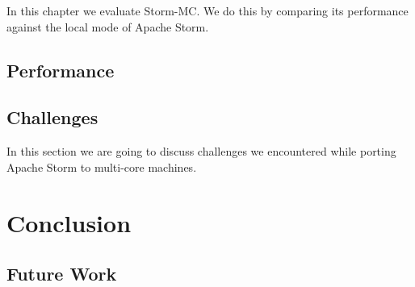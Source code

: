 \documentclass[bsc,logo,frontabs,twoside,singlespacing,normalheadings,parskip]{infthesis}     %
\begin{document}
In this chapter we evaluate Storm-MC. We do this by comparing its performance against the local mode of Apache Storm.

\section{Performance}



\section{Challenges}

In this section we are going to discuss challenges we encountered while porting Apache Storm to multi-core machines.




\chapter{Conclusion}

\section{Future Work}




\end{document}
